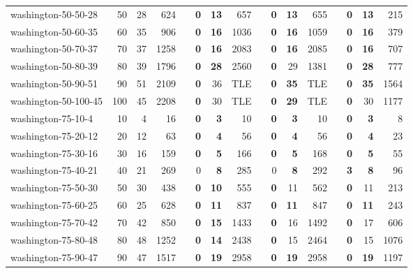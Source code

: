 \begin{table}[!ht]
{\begin{tabular}{lrrrrrrrrrrrlrrr}
washington-50-50-28 & 50 & 28 & 624 &  & \textbf{0} & \textbf{13} & 657 &  & \textbf{0} & \textbf{13} & 655 &  & \textbf{0} & \textbf{13} & 215 \\
washington-50-60-35 & 60 & 35 & 906 &  & \textbf{0} & \textbf{16} & 1036 &  & \textbf{0} & \textbf{16} & 1059 &  & \textbf{0} & \textbf{16} & 379 \\
washington-50-70-37 & 70 & 37 & 1258 &  & \textbf{0} & \textbf{16} & 2083 &  & \textbf{0} & \textbf{16} & 2085 &  & \textbf{0} & \textbf{16} & 707 \\
washington-50-80-39 & 80 & 39 & 1796 &  & \textbf{0} & \textbf{28} & 2560 &  & \textbf{0} & 29 & 1381 &  & \textbf{0} & \textbf{28} & 777 \\
washington-50-90-51 & 90 & 51 & 2109 &  & \textbf{0} & 36 & TLE &  & \textbf{0} & \textbf{35} & TLE &  & \textbf{0} & \textbf{35} & 1564 \\
washington-50-100-45 & 100 & 45 & 2208 &  & \textbf{0} & 30 & TLE &  & \textbf{0} & \textbf{29} & TLE &  & \textbf{0} & 30 & 1177 \\ \hline
washington-75-10-4 & 10 & 4 & 16 &  & \textbf{0} & \textbf{3} & 10 &  & \textbf{0} & \textbf{3} & 10 &  & \textbf{0} & \textbf{3} & 8 \\
washington-75-20-12 & 20 & 12 & 63 &  & \textbf{0} & \textbf{4} & 56 &  & \textbf{0} & \textbf{4} & 56 &  & \textbf{0} & \textbf{4} & 23 \\
washington-75-30-16 & 30 & 16 & 159 &  & \textbf{0} & \textbf{5} & 166 &  & \textbf{0} & \textbf{5} & 168 &  & \textbf{0} & \textbf{5} & 55 \\
washington-75-40-21 & 40 & 21 & 269 &  & 0 & \textbf{8} & 285 &  & 0 & \textbf{8} & 292 &  & \textbf{3} & \textbf{8} & 96 \\
washington-75-50-30 & 50 & 30 & 438 &  & \textbf{0} & \textbf{10} & 555 &  & \textbf{0} & 11 & 562 &  & \textbf{0} & 11 & 213 \\
washington-75-60-25 & 60 & 25 & 628 &  & \textbf{0} & \textbf{11} & 837 &  & \textbf{0} & \textbf{11} & 847 &  & \textbf{0} & \textbf{11} & 243 \\
washington-75-70-42 & 70 & 42 & 850 &  & \textbf{0} & \textbf{15} & 1433 &  & \textbf{0} & 16 & 1492 &  & \textbf{0} & 17 & 606 \\
washington-75-80-48 & 80 & 48 & 1252 &  & \textbf{0} & \textbf{14} & 2438 &  & \textbf{0} & 15 & 2464 &  & \textbf{0} & 15 & 1076 \\
washington-75-90-47 & 90 & 47 & 1517 &  & \textbf{0} & \textbf{19} & 2958 &  & \textbf{0} & \textbf{19} & 2958 &  & \textbf{0} & \textbf{19} & 1197 \\

\end{tabular}}
\end{table}
